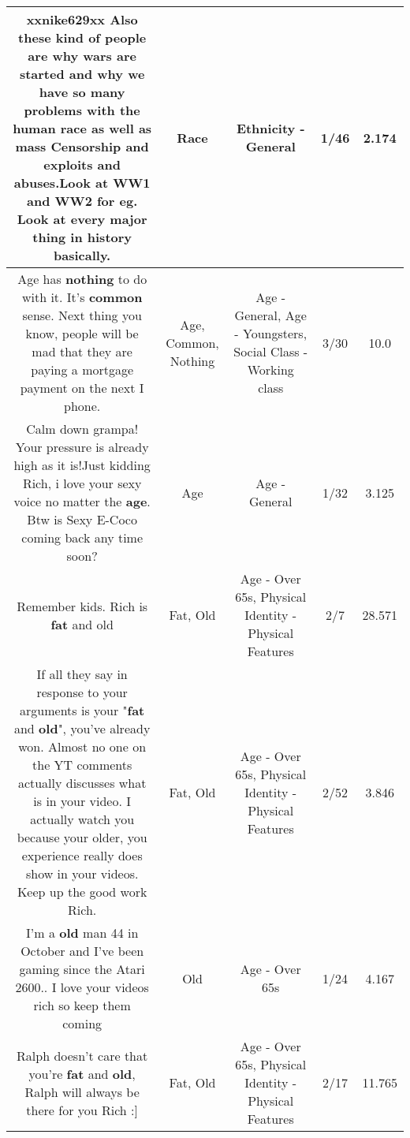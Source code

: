 \documentclass[11pt]{article}
\newlength\mylength
\begin{document}
\begin{center}
\begin{longtable}{|C{.65\mylength}|C{.30\mylength}|C{.12\mylength}|C{.12\mylength}|C{.12\mylength}|}
  \small xxnike629xx Also these kind of people are why wars are started and why we have so many problems with the human \textbf{race} as well as mass Censorship and exploits and abuses.Look at WW1 and WW2 for eg. Look at every major thing in history basically.\normalsize   & Race & Ethnicity - General & 1/46 & 2.174 \\  \hline
  \small Age has \textbf{nothing} to do with it.  It's \textbf{common} sense.  Next thing you know, people will be mad that they are paying a mortgage payment on the next I phone.\normalsize   & Age, Common, Nothing & Age - General, Age - Youngsters, Social Class - Working class & 3/30 & 10.0 \\  \hline
  \small Calm down grampa! Your pressure is already high as it is!Just kidding Rich,  i love your sexy voice no matter the \textbf{age}. Btw is Sexy E-Coco coming back any time soon?\normalsize   & Age & Age - General & 1/32 & 3.125 \\  \hline
  \small Remember kids. Rich is \textbf{fat} and old\normalsize   & Fat, Old & Age - Over 65s, Physical Identity - Physical Features & 2/7 & 28.571 \\  \hline
  \small If all they say in response to your arguments is your "\textbf{fat} and \textbf{old}", you've already won. Almost no one on the YT comments actually discusses what is in your video. I actually watch you because your older, you experience really does show in your videos. Keep up the good work Rich.\normalsize   & Fat, Old & Age - Over 65s, Physical Identity - Physical Features & 2/52 & 3.846 \\  \hline
  \small I'm a \textbf{old} man 44 in October and I've been gaming since the Atari 2600.. I love your videos rich so keep them coming\normalsize   & Old & Age - Over 65s & 1/24 & 4.167 \\  \hline
  \small Ralph doesn't care that you're \textbf{fat} and \textbf{old}, Ralph will always be there for you Rich :]\normalsize   & Fat, Old & Age - Over 65s, Physical Identity - Physical Features & 2/17 & 11.765 \\  \hline

\end{longtable}
\end{center}
\end{document}

